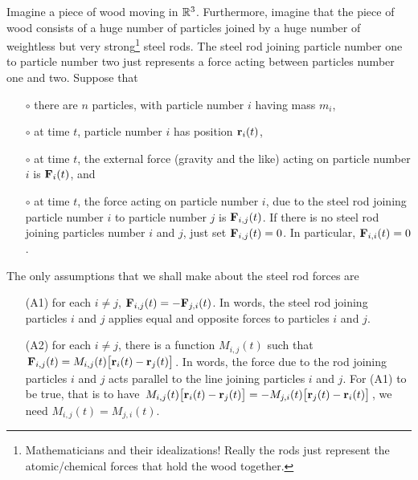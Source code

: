 Imagine a piece of wood moving in $\mathbb{R}^3$.
Furthermore, imagine that the piece of wood consists of a huge number of
particles joined by a huge number of weightless but very 
strong\footnote{Mathematicians and their idealizations! Really the rods just
represent the atomic/chemical forces that hold the wood together.} steel rods.
The steel rod joining particle number one to particle number two just
represents a force acting between particles number one and two.
Suppose that
\begin{itemize}\itemsep1pt \parskip0pt  %
\item[$\circ$] 
there are $n$ particles, with particle number $i$ having mass $m_i$,
\item[$\circ$] 
at time $t$, particle number $i$ has position $\mathbf{r}_i(t)$,
\item[$\circ$] 
at time $t$,  the external force (gravity and the like)
acting on particle number $i$ is $\mathbf{F}_i(t)$, and
\item[$\circ$] 
at time $t$, the force acting on particle number $i$,
due to the steel rod joining particle number $i$ to particle number $j$
is $\mathbf{F}_{i,j}(t)$. If there is no steel rod joining particles 
number $i$ and $j$, just set
$\mathbf{F}_{i,j}(t)=0$. In particular, $\mathbf{F}_{i,i}(t)=0$.
\end{itemize}
The only assumptions that we shall make about the steel rod forces are
\begin{itemize}\itemsep1pt \parskip0pt  %
\item[(A1)]
for each $i\ne j$, $\mathbf{F}_{i,j}(t)=-\mathbf{F}_{j,i}(t)$. In words, 
the steel rod joining particles $i$ and $j$ applies equal and opposite 
forces to particles $i$ and $j$.
\item[(A2)] 
for each $i\ne j$, there is a function $M_{i,j}(t)$ such
that $\mathbf{F}_{i,j}(t)=M_{i,j}(t)\big[\mathbf{r}_i(t)-\mathbf{r}_j(t)\big]$. In words, 
the force due to the rod joining particles $i$ and $j$ acts parallel to the 
line joining particles $i$ and $j$. For (A1) to be true, that is 
to have $M_{i,j}(t)\big[\mathbf{r}_i(t)-\mathbf{r}_j(t)\big]
=-M_{j,i}(t)\big[\mathbf{r}_j(t)-\mathbf{r}_i(t)\big]$, we need 
$M_{i,j}(t)=M_{j,i}(t)$.
\end{itemize}

